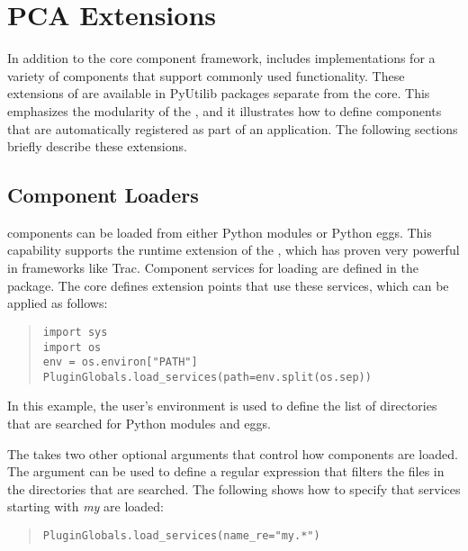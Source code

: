 
\section{PCA Extensions}

\label{chap:extensions}

In addition to the core component framework, \pcasp includes implementations
for a variety of components that support commonly used functionality. 
These extensions of \pcasp are available in PyUtilib packages separate 
from the \pcasp core.  This emphasizes the modularity of the \pca, 
and it illustrates how to define \pcasp components that are 
automatically registered as part of an application.
The following sections briefly describe these \pcasp extensions.


\subsection{Component Loaders}

\label{sec:loaders}

\pcasp components can be loaded from either Python modules or Python eggs. This
capability supports the runtime extension of the \pca,
which has proven very powerful in frameworks like Trac. 
Component services for loading are defined in the  package.
The core \pcasp
defines extension points that use these services, which can be
applied as follows:
\begin{quotation}
\begin{lstlisting}
import sys
import os
env = os.environ["PATH"]
PluginGlobals.load_services(path=env.split(os.sep))
\end{lstlisting}
\end{quotation}
In this example, the user's  environment is used to define the list
of directories that are searched for Python modules and eggs.  

The  takes two other optional arguments that control
how components are loaded.  The  argument can be used to
define a regular expression that filters the files in the directories
that are searched.  The following shows how to specify that services starting with \textit{my}
are loaded:
\begin{quotation}
\begin{lstlisting}
PluginGlobals.load_services(name_re="my.*")
\end{lstlisting}
\end{quotation}

